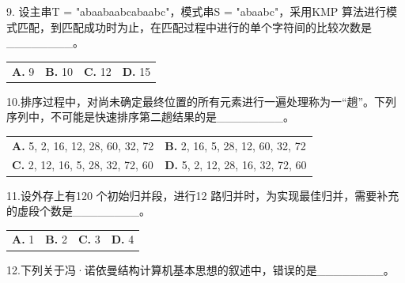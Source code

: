 \documentclass[UTF8,11pt]{ctexart}
\begin{document}
9. 设主串T = "abaabaabcabaabc"，模式串S = "abaabc"，采用KMP 算法进行模式匹配，到匹配成功时为止，在匹配过程中进行的单个字符间的比较次数是\_\_\_\_\_\_\_\_。


\begin{center}\begin{tabular}{>{\raggedright\arraybackslash}p{\dimexpr(\linewidth-8\tabcolsep)/4\relax}>{\raggedright\arraybackslash}p{\dimexpr(\linewidth-8\tabcolsep)/4\relax}>{\raggedright\arraybackslash}p{\dimexpr(\linewidth-8\tabcolsep)/4\relax}>{\raggedright\arraybackslash}p{\dimexpr(\linewidth-8\tabcolsep)/4\relax}}
\textbf{A.} 9 & \textbf{B.} 10 & \textbf{C.} 12 & \textbf{D.} 15\\[.35em]\end{tabular}\end{center}

10.排序过程中，对尚未确定最终位置的所有元素进行一遍处理称为一“趟”。下列序列中，不可能是快速排序第二趟结果的是\_\_\_\_\_\_\_\_。


\begin{center}\begin{tabular}{>{\raggedright\arraybackslash}p{\dimexpr(\linewidth-4\tabcolsep)/2\relax}>{\raggedright\arraybackslash}p{\dimexpr(\linewidth-4\tabcolsep)/2\relax}}
\textbf{A.} 5, 2, 16, 12, 28, 60, 32, 72 & \textbf{B.} 2, 16, 5, 28, 12, 60, 32, 72\\[.35em]
\textbf{C.} 2, 12, 16, 5, 28, 32, 72, 60 & \textbf{D.} 5, 2, 12, 28, 16, 32, 72, 60\\[.35em]\end{tabular}\end{center}

11.设外存上有120 个初始归并段，进行12 路归并时，为实现最佳归并，需要补充的虚段个数是\_\_\_\_\_\_\_\_。


\begin{center}\begin{tabular}{>{\raggedright\arraybackslash}p{\dimexpr(\linewidth-8\tabcolsep)/4\relax}>{\raggedright\arraybackslash}p{\dimexpr(\linewidth-8\tabcolsep)/4\relax}>{\raggedright\arraybackslash}p{\dimexpr(\linewidth-8\tabcolsep)/4\relax}>{\raggedright\arraybackslash}p{\dimexpr(\linewidth-8\tabcolsep)/4\relax}}
\textbf{A.} 1 & \textbf{B.} 2 & \textbf{C.} 3 & \textbf{D.} 4\\[.35em]\end{tabular}\end{center}

12.下列关于冯·诺依曼结构计算机基本思想的叙述中，错误的是\_\_\_\_\_\_\_\_。
\end{document}
